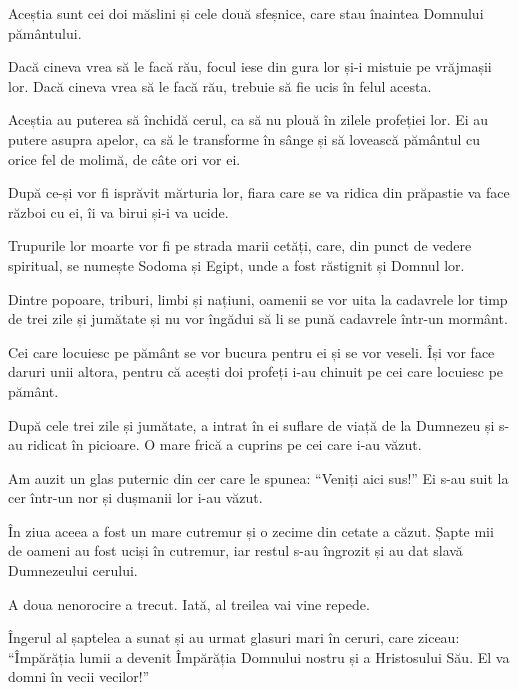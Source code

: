 {\par }{\PP {}Aceștia sunt cei doi măslini și cele două sfeșnice, care stau înaintea Domnului pământului.

Dacă cineva vrea să le facă rău, focul iese din gura lor și-i mistuie pe vrăjmașii lor. Dacă cineva vrea să le facă rău, trebuie să fie ucis în felul acesta.

Aceștia au puterea să închidă cerul, ca să nu plouă în zilele profeției lor. Ei au putere asupra apelor, ca să le transforme în sânge și să lovească pământul cu orice fel de molimă, de câte ori vor ei.


\par }{\PP {}După ce-și vor fi isprăvit mărturia lor, fiara care se va ridica din prăpastie va face război cu ei, îi va birui și-i va ucide.

Trupurile lor moarte vor fi pe strada marii cetăți, care, din punct de vedere spiritual, se numește Sodoma și Egipt, unde a fost răstignit și Domnul lor.

Dintre popoare, triburi, limbi și națiuni, oamenii se vor uita la cadavrele lor timp de trei zile și jumătate și nu vor îngădui să li se pună cadavrele într-un mormânt.

Cei care locuiesc pe pământ se vor bucura pentru ei și se vor veseli. Își vor face daruri unii altora, pentru că acești doi profeți i-au chinuit pe cei care locuiesc pe pământ.


\par }{\PP {}După cele trei zile și jumătate, a intrat în ei suflare de viață de la Dumnezeu și s-au ridicat în picioare. O mare frică a cuprins pe cei care i-au văzut.

Am auzit un glas puternic din cer care le spunea: “Veniți aici sus!” Ei s-au suit la cer într-un nor și dușmanii lor i-au văzut.

În ziua aceea a fost un mare cutremur și o zecime din cetate a căzut. Șapte mii de oameni au fost uciși în cutremur, iar restul s-au îngrozit și au dat slavă Dumnezeului cerului.


\par }{\PP {}A doua nenorocire a trecut. Iată, al treilea vai vine repede.


\par }{\PP {}Îngerul al șaptelea a sunat și au urmat glasuri mari în ceruri, care ziceau: “Împărăția lumii a devenit Împărăția Domnului nostru și a Hristosului Său. El va domni în vecii vecilor!”


}
